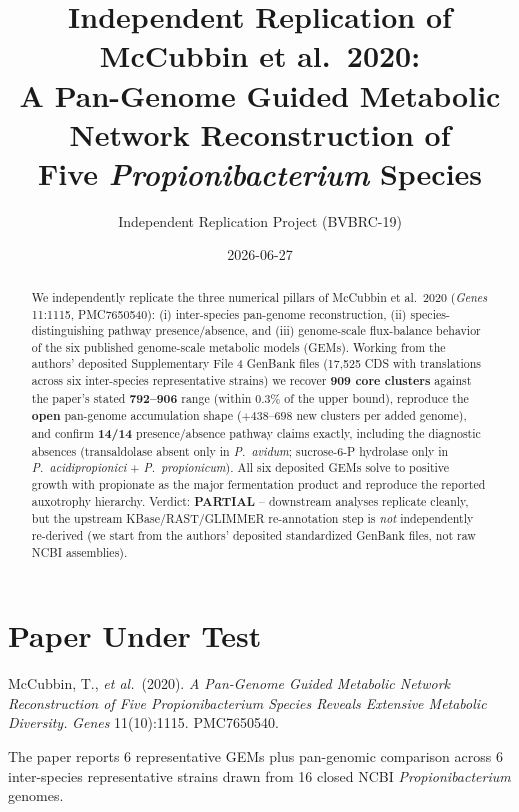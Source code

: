 \documentclass[11pt]{article}
\title{Independent Replication of McCubbin et al.\ 2020:\\
A Pan-Genome Guided Metabolic Network Reconstruction of\\
Five \emph{Propionibacterium} Species}
\author{Independent Replication Project (BVBRC-19)}
\date{2026-06-27}
\begin{document}
\maketitle

\begin{abstract}
We independently replicate the three numerical pillars of McCubbin et al.\ 2020
(\emph{Genes} 11:1115, PMC7650540): (i) inter-species pan-genome reconstruction,
(ii) species-distinguishing pathway presence/absence, and (iii) genome-scale
flux-balance behavior of the six published genome-scale metabolic models (GEMs).
Working from the authors' deposited Supplementary File 4 GenBank files (17{,}525
CDS with translations across six inter-species representative strains) we recover
\textbf{909 core clusters} against the paper's stated \textbf{792--906} range
(within 0.3\% of the upper bound), reproduce the \textbf{open} pan-genome
accumulation shape ($+438$--$698$ new clusters per added genome), and confirm
\textbf{14/14} presence/absence pathway claims exactly, including the diagnostic
absences (transaldolase absent only in \emph{P.\ avidum}; sucrose-6-P hydrolase
only in \emph{P.\ acidipropionici} + \emph{P.\ propionicum}). All six deposited
GEMs solve to positive growth with propionate as the major fermentation product
and reproduce the reported auxotrophy hierarchy. Verdict: \textbf{PARTIAL} --
downstream analyses replicate cleanly, but the upstream KBase/RAST/GLIMMER
re-annotation step is \emph{not} independently re-derived (we start from the
authors' deposited standardized GenBank files, not raw NCBI assemblies).
\end{abstract}

\section{Paper Under Test}
McCubbin, T., \emph{et al.}\ (2020). \emph{A Pan-Genome Guided Metabolic Network
Reconstruction of Five Propionibacterium Species Reveals Extensive Metabolic
Diversity.} \emph{Genes} 11(10):1115. PMC7650540.

The paper reports 6 representative GEMs plus pan-genomic comparison across
6 inter-species representative strains drawn from 16 closed NCBI
\emph{Propionibacterium} genomes.
\end{document}
